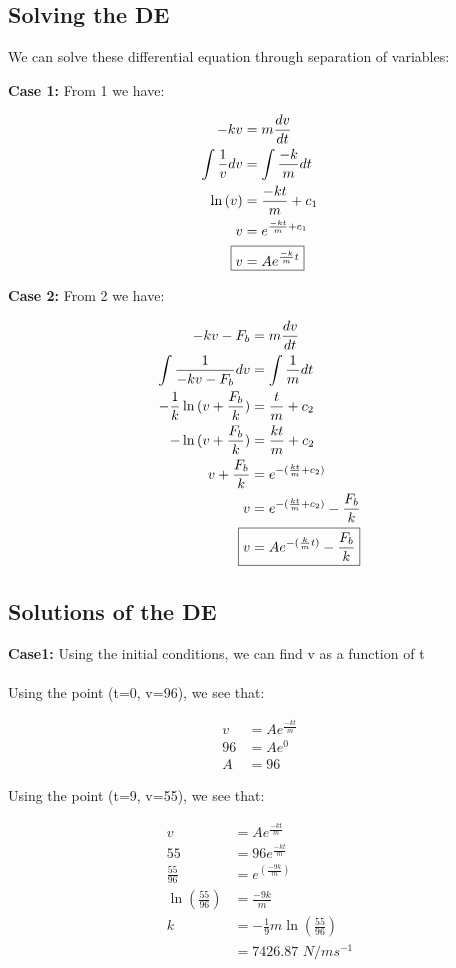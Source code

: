 \subsection{Solving the DE}
We can solve these differential equation through separation of variables:

\textbf{Case 1: }
From 1 we have:

\begin{align*}
    -kv &= m \frac{dv}{dt}
    \\ \int \frac{1}{v} dv &= \int \frac{-k}{m} dt
    \\ \ln{(v)} &= \frac{-kt}{m} + c_1
    \\ v &= e^{\frac{-kt}{m} + c_1}
    \\ \Aboxed{v &= Ae^{\frac{-k}{m}t}}
\end{align*}

\textbf{Case 2:}
From 2 we have: 

\begin{align*}
    -kv - F_b &= m \frac{dv}{dt}
    \\ \int \frac{1}{-kv - F_b} dv &= \int \frac{1}{m} dt
    \\ -\frac{1}{k} \ln{(v + \frac{F_b}{k})} &= \frac{t}{m} + c_2
    \\ - \ln{(v + \frac{F_b}{k})} &= \frac{kt}{m} + c_2
    \\ v + \frac{F_b}{k} &= e^{-(\frac{kt}{m} + c_2)}
    \\ v &= e^{-(\frac{kt}{m} + c_2)} - \frac{F_b}{k}
    \\ \Aboxed{v &= Ae^{-(\frac{k}{m}t)} - \frac{F_b}{k}}
\end{align*}

\subsection{Solutions of the DE}
\textbf{Case1: } 
Using the initial conditions, we can find v as a function of t
\\ \\
Using the point (t=0, v=96), we see that:
\begin{center}
\begin{align*}
    v &= Ae^{\frac{-kt}{m}}
    \\ 96 &= Ae^0
    \\ A &= 96
\end{align*}
\end{center}
Using the point (t=9, v=55), we see that:
\begin{center}
\begin{align*}
    v &= Ae^{\frac{-kt}{m}}
    \\ 55 &= 96e^{\frac{-kt}{m}}
    \\ \frac{55}{96} &= e^{(\frac{-9k}{m})}
    \\ \ln{(\frac{55}{96})} &= \frac{-9k}{m}
    \\ k &= -\frac{1}{9}m\ln{(\frac{55}{96})}
    \\ &= \text{7426.87 $N/ms^{-1}$}
\end{align*}
\end{center}

